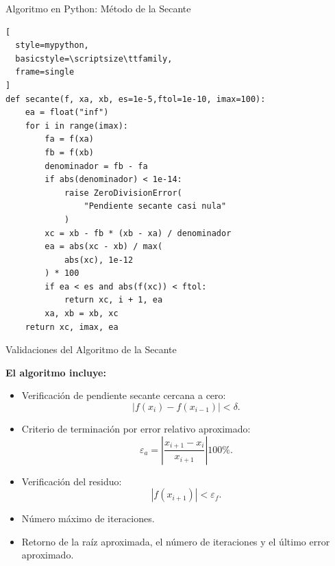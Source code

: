 \documentclass[../../main.tex]{subfiles}
\begin{document}

\begin{frame}[fragile]{Algoritmo en Python: Método de la Secante}

\begin{lstlisting}[
  style=mypython,
  basicstyle=\scriptsize\ttfamily,
  frame=single
]
def secante(f, xa, xb, es=1e-5,ftol=1e-10, imax=100):
    ea = float("inf")
    for i in range(imax):
        fa = f(xa)
        fb = f(xb)
        denominador = fb - fa
        if abs(denominador) < 1e-14:
            raise ZeroDivisionError(
                "Pendiente secante casi nula"
            )
        xc = xb - fb * (xb - xa) / denominador
        ea = abs(xc - xb) / max(
            abs(xc), 1e-12
        ) * 100
        if ea < es and abs(f(xc)) < ftol:
            return xc, i + 1, ea
        xa, xb = xb, xc
    return xc, imax, ea
\end{lstlisting}

\end{frame}



\begin{frame}{Validaciones del Algoritmo de la Secante}

\textbf{El algoritmo incluye:}

\begin{itemize}
  \item Verificación de pendiente secante cercana a cero:
  \[
  |f(x_i)-f(x_{i-1})|<\delta.
  \]

  \item Criterio de terminación por error relativo aproximado:
  \[
  \varepsilon_a
  =
  \left|
  \frac{x_{i+1}-x_i}{x_{i+1}}
  \right|100\%.
  \]

  \item Verificación del residuo:
  \[
  |f(x_{i+1})|<\varepsilon_f.
  \]

  \item Número máximo de iteraciones.

  \item Retorno de la raíz aproximada, el número de iteraciones
        y el último error aproximado.
\end{itemize}

\end{frame}
\end{document}
